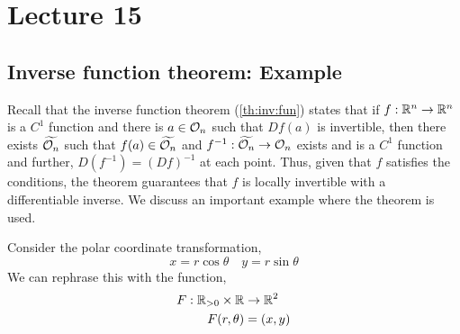 \documentclass[../Analysis-3.tex]{subfiles}
\begin{document}
\chapter*{Lecture 15} %
\setcounter{chapter}{15} %
\setcounter{section}{0}
\setcounter{equation}{0}
\setcounter{figure}{0}


\section{Inverse function theorem: Example}

Recall that the inverse function theorem (\ref{th:inv:fun}) states that if \( f: \mathbb{R}^n \to \mathbb{R}^n  \) is a \( C^1 \) function and there is \( a \in \mathcal{O}_{n} \) such that \( Df(a) \) is invertible, then there exists \( \widetilde{\mathcal{O}_{n}} \) such that \( f(a) \in \widetilde{\mathcal{O}_{n}} \) and \( f^{-1}: \widetilde{\mathcal{O}_{n}} \to \mathcal{O}_{n} \) exists and is a \( C^1 \) function and further, \( D(f^{-1}) = (Df)^{-1} \) at each point. Thus, given that \( f \) satisfies the conditions, the theorem guarantees that \( f \) is locally invertible with a differentiable inverse. We discuss an important example where the theorem is used.
\smallskip

Consider the polar coordinate transformation,
\[
  x = r \cos \theta \quad y = r \sin \theta
\]
We can rephrase this with the function,
\begin{align*}
  F: \mathbb{R}_{> 0} \times \mathbb{R} & \to \mathbb{R}^2 \\
  F(r, \theta)          & = (x,y)
\end{align*}
\end{document}
